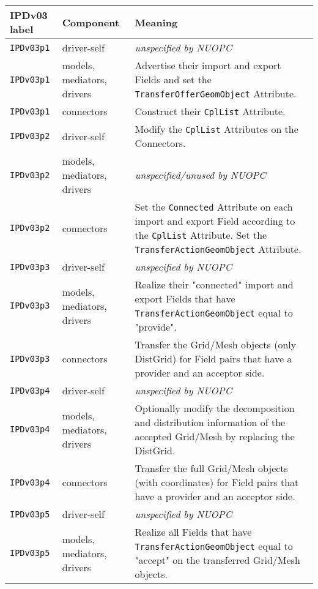 \vspace*{3ex}
\begin{longtable}[h]{|p{35mm}|p{4cm}|p{6cm}|}
     \hline\hline
     {\bf IPDv03 label} & {\bf Component} & {\bf Meaning}\\
     \hline\hline
     {\tt IPDv03p1} & driver-self                 & {\em unspecified by NUOPC}\\ \hline
     {\tt IPDv03p1} & models, mediators, drivers  & Advertise their import and export Fields and set the {\tt TransferOfferGeomObject} Attribute.\\ \hline
     {\tt IPDv03p1} & connectors                  & Construct their {\tt CplList} Attribute.\\ \hline
     {\tt IPDv03p2} & driver-self                 & Modify the {\tt CplList} Attributes on the Connectors.\\ \hline
     {\tt IPDv03p2} & models, mediators, drivers  & {\em unspecified/unused by NUOPC}\\ \hline
     {\tt IPDv03p2} & connectors                  & Set the {\tt Connected} Attribute on each import and export Field according to the {\tt CplList} Attribute. Set the {\tt TransferActionGeomObject} Attribute.\\ \hline
     {\tt IPDv03p3} & driver-self                 & {\em unspecified by NUOPC}\\ \hline
     {\tt IPDv03p3} & models, mediators, drivers  & Realize their "connected" import and export Fields that have {\tt TransferActionGeomObject} equal to "provide".\\ \hline
     {\tt IPDv03p3} & connectors                  & Transfer the Grid/Mesh objects (only DistGrid) for Field pairs that have a provider and an acceptor side.\\ \hline
     {\tt IPDv03p4} & driver-self                 & {\em unspecified by NUOPC}\\ \hline
     {\tt IPDv03p4} & models, mediators, drivers  & Optionally modify the decomposition and distribution information of the accepted Grid/Mesh by replacing the DistGrid.\\ \hline
     {\tt IPDv03p4} & connectors                  & Transfer the full Grid/Mesh objects (with coordinates) for Field pairs that have a provider and an acceptor side.\\ \hline
     {\tt IPDv03p5} & driver-self                 & {\em unspecified by NUOPC}\\ \hline
     {\tt IPDv03p5} & models, mediators, drivers  & Realize all Fields that have {\tt TransferActionGeomObject} equal to "accept" on the transferred Grid/Mesh objects.\\ \hline

\end{longtable}
